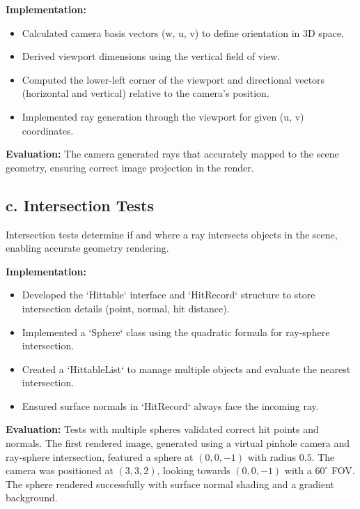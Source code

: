 \documentclass[11pt,a4paper]{article}
\begin{document}
\noindent\textbf{Implementation:}
\begin{itemize} \item Calculated camera basis vectors (w, u, v) to define orientation in 3D space.
\item Derived viewport dimensions using the vertical field of view.
\item Computed the lower-left corner of the viewport and directional vectors (horizontal and vertical) relative to the camera's position.
\item Implemented ray generation through the viewport for given (u, v) coordinates.
\end{itemize}

\noindent\textbf{Evaluation:}
The camera generated rays that accurately mapped to the scene geometry, ensuring correct image projection in the render.

\subsection{c. Intersection Tests}  
\label{sec:intersection-tests}

Intersection tests determine if and where a ray intersects objects in the scene, enabling accurate geometry rendering.

\noindent\textbf{Implementation:}  
\begin{itemize}
    \item Developed the `Hittable` interface and `HitRecord` structure to store intersection details (point, normal, hit distance).  
    \item Implemented a `Sphere` class using the quadratic formula for ray-sphere intersection.  
    \item Created a `HittableList` to manage multiple objects and evaluate the nearest intersection.  
    \item Ensured surface normals in `HitRecord` always face the incoming ray.  
\end{itemize}

\noindent\textbf{Evaluation:}  
Tests with multiple spheres validated correct hit points and normals. The first rendered image, generated using a virtual pinhole camera and ray-sphere intersection, featured a sphere at \((0, 0, -1)\) with radius \(0.5\). The camera was positioned at \((3, 3, 2)\), looking towards \((0, 0, -1)\) with a \(60^\circ\) FOV. The sphere rendered successfully with surface normal shading and a gradient background.  
\end{document}

